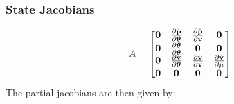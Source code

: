 \subsubsection{State Jacobians}
\begin{equation}
  A =
  \begin{bmatrix}
    \boldsymbol{\mathrm{0}} & \frac{\partial \dot{\boldsymbol{\mathrm{p}}}}{\partial \boldsymbol{\mathrm{\theta}}} &
    \frac{\partial \dot{\boldsymbol{\mathrm{p}}}}{\partial \boldsymbol{\mathrm{v}}} & \boldsymbol{\mathrm{0}} \\
    \boldsymbol{\mathrm{0}} & \frac{\partial \dot{\boldsymbol{\mathrm{\theta}}}}{\partial \boldsymbol{\mathrm{\theta}}} &
    \boldsymbol{\mathrm{0}} & \boldsymbol{\mathrm{0}} \\
    \boldsymbol{\mathrm{0}} & \frac{\partial \dot{\boldsymbol{\mathrm{v}}}}{\partial \boldsymbol{\mathrm{\theta}}} & \frac{\partial \dot{\boldsymbol{\mathrm{v}}}}{\partial \boldsymbol{\mathrm{v}}} & \frac{\partial \dot{\boldsymbol{\mathrm{v}}}}{\partial \mu} \\
    \boldsymbol{\mathrm{0}} & \boldsymbol{\mathrm{0}} & \boldsymbol{\mathrm{0}} & 0 
  \end{bmatrix}
\end{equation}
The partial jacobians are then given by:
